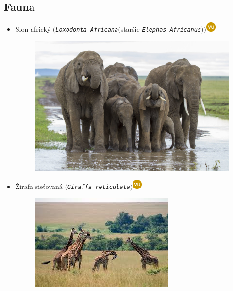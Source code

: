 \documentclass{article}
\begin{document}
\subsection{Fauna}

\begin{itemize}
\item Slon africký $($\texttt{\textit{Loxodonta Africana$($}}staršie \texttt{\textit{Elephas Africanus$)$}}$)$\includegraphics[width=0.04\textwidth,natwidth=200,natheight=200]{VU.png}\\
\begin{figure}[h]
\includegraphics[scale=0.8]{Slony-masai.jpg}
\end{figure}
\item Žirafa sieťovaná $($\texttt{\textit{Giraffa reticulata}}$)$\includegraphics[width=0.04\textwidth,natwidth=200,natheight=200]{VU.png}
\begin{figure}[h]

\includegraphics[scale=0.8]{zirafa-masai.jpeg}
\end{figure}


\end{itemize}
\end{document}
